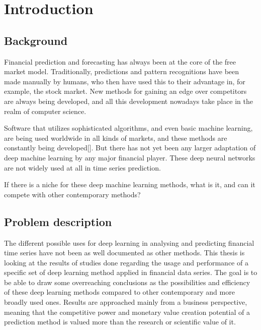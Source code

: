 \section{Introduction}

\subsection{Background}

Financial prediction and forecasting has always been at the core of the free market model. Traditionally, predictions and pattern recognitions have been made manually by humans, who then have used this to their advantage in, for example, the stock market. New methods for gaining an edge over competitors are always being developed, and all this development nowadays take place in the realm of computer science.

Software that utilizes sophisticated algorithms, and even basic machine learning, are being used worldwide in all kinds of markets, and these methods are constantly being developed[]. But there has not yet been any larger adaptation of deep machine learning by any major financial player. These deep neural networks are not widely used at all in time series prediction.

If there is a niche for these deep machine learning methods, what is it, and can it compete with other contemporary methods?


\subsection{Problem description}


The different possible uses for deep learning in analysing and predicting financial time series have not been as well documented as other methods. This thesis is looking at the results of studies done regarding the usage and performance of a specific set of deep learning method applied in financial data series. The goal is to be able to draw some overreaching conclusions as the possibilities and efficiency of these deep learning methods compared to other contemporary and more broadly used ones. Results are approached mainly from a business perspective, meaning that the competitive power and monetary value creation potential of a prediction method is valued more than the research or scientific value of it.


